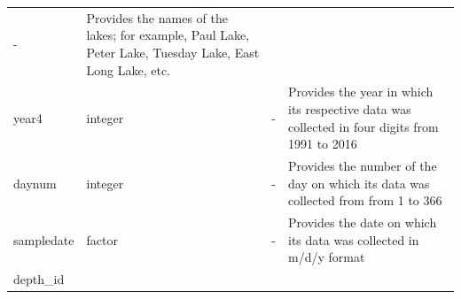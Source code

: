 \documentclass[12pt,]{article}
\begin{document}
\begin{longtable}[]{@{}llll@{}}
\begin{minipage}[t]{0.12\columnwidth}
-\strut
\end{minipage} & \begin{minipage}[t]{0.38\columnwidth}\raggedright
Provides the names of the lakes; for example, Paul Lake, Peter Lake,
Tuesday Lake, East Long Lake, etc.\strut
\end{minipage}\tabularnewline
\begin{minipage}[t]{0.25\columnwidth}\raggedright
year4\strut
\end{minipage} & \begin{minipage}[t]{0.13\columnwidth}\raggedright
integer\strut
\end{minipage} & \begin{minipage}[t]{0.12\columnwidth}\raggedright
-\strut
\end{minipage} & \begin{minipage}[t]{0.38\columnwidth}\raggedright
Provides the year in which its respective data was collected in four
digits from 1991 to 2016\strut
\end{minipage}\tabularnewline
\begin{minipage}[t]{0.25\columnwidth}\raggedright
daynum\strut
\end{minipage} & \begin{minipage}[t]{0.13\columnwidth}\raggedright
integer\strut
\end{minipage} & \begin{minipage}[t]{0.12\columnwidth}\raggedright
-\strut
\end{minipage} & \begin{minipage}[t]{0.38\columnwidth}\raggedright
Provides the number of the day on which its data was collected from from
1 to 366\strut
\end{minipage}\tabularnewline
\begin{minipage}[t]{0.25\columnwidth}\raggedright
sampledate\strut
\end{minipage} & \begin{minipage}[t]{0.13\columnwidth}\raggedright
factor\strut
\end{minipage} & \begin{minipage}[t]{0.12\columnwidth}\raggedright
-\strut
\end{minipage} & \begin{minipage}[t]{0.38\columnwidth}\raggedright
Provides the date on which its data was collected in m/d/y format\strut
\end{minipage}\tabularnewline
\begin{minipage}[t]{0.25\columnwidth}\raggedright
depth\_id\strut

\end{minipage}
\end{longtable}
\end{document}
